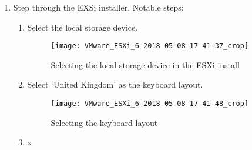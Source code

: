 \begin{enumerate}[resume*=task1methodology]
  \item Step through the EXSi installer. Notable steps:
    \begin{enumerate}[label=\alph*)]
      \item Select the local storage device.
        \begin{figure}[H]
          \centering
          \captionsetup{skip=2pt}
          \texttt{[image: VMware\_ESXi\_6-2018-05-08-17-41-37\_crop]}
          \caption{Selecting the local storage device in the ESXi install}
          \label{fig:task1:esxiinstall_01}
        \end{figure}
      \item Select `United Kingdom' as the keyboard layout.
        \begin{figure}[H]
          \centering
          \captionsetup{skip=2pt}
          \texttt{[image: VMware\_ESXi\_6-2018-05-08-17-41-48\_crop]}
          \caption{Selecting the keyboard layout}
          \label{fig:task1:esxiinstall_02}
        \end{figure}
      \item x
    \end{enumerate}
\end{enumerate}

